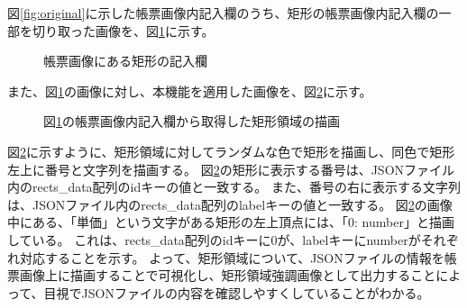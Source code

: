 図\ref{fig:original}に示した帳票画像内記入欄のうち、矩形の帳票画像内記入欄の一部を切り取った画像を、図\ref{fig:rect_original}に示す。

\begin{figure}[tp]
    \begin{center}
        \caption{帳票画像にある矩形の記入欄}
        \label{fig:rect_original}
    \end{center}
\end{figure}

また、図\ref{fig:rect_original}の画像に対し、本機能を適用した画像を、図\ref{fig:rect_drawing}に示す。

\begin{figure}[tp]
    \begin{center}
        \caption{図\ref{fig:rect_original}の帳票画像内記入欄から取得した矩形領域の描画}
        \label{fig:rect_drawing}
    \end{center}
\end{figure}

図\ref{fig:rect_drawing}に示すように、矩形領域に対してランダムな色で矩形を描画し、同色で矩形左上に番号と文字列を描画する。
図\ref{fig:rect_drawing}の矩形に表示する番号は、JSONファイル内のrects\_data配列のidキーの値と一致する。
また、番号の右に表示する文字列は、JSONファイル内のrects\_data配列のlabelキーの値と一致する。
図\ref{fig:rect_drawing}の画像中にある、「単価」という文字がある矩形の左上頂点には、「0: number」と描画している。
これは、rects\_data配列のidキーに0が、labelキーにnumberがそれぞれ対応することを示す。
よって、矩形領域について、JSONファイルの情報を帳票画像上に描画することで可視化し、矩形領域強調画像として出力することによって、目視でJSONファイルの内容を確認しやすくしていることがわかる。

